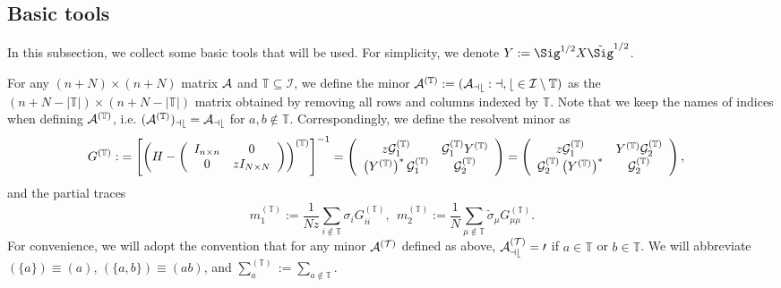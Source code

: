 \subsection{Basic tools}
In this subsection, we collect some basic tools that will be used. For simplicity, we denote $Y:=\Sig^{1/2} X \tilde \Sig^{1/2}$. 

\begin{definition}[Minors]
For any $ (n+N)\times (n+N)$ matrix $\cal A$ and $\mathbb T \subseteq \mathcal I$, we define the minor $\cal A^{(\mathbb T)}:=(\cal A_{ab}:a,b \in \mathcal I\setminus \mathbb T)$ as the $ (n+N-|\mathbb T|)\times (n+N-|\mathbb T|)$ matrix obtained by removing all rows and columns indexed by $\mathbb T$. Note that we keep the names of indices when defining $\cal A^{(\mathbb T)}$, i.e. $(\cal A^{(\mathbb{T})})_{ab}= \cal A_{ab}$ for $a,b \notin \mathbb{{T}}$. Correspondingly, we define the resolvent minor as
\begin{align*}
G^{(\mathbb T)}:&=\left[\left(H - \left( {\begin{array}{*{20}c}
   { I_{n\times n}} & 0  \\
   0 & { zI_{N\times N}}  \\
\end{array}} \right)\right)^{(\mathbb T)}\right]^{-1} = \left( {\begin{array}{*{20}c}
   { z\mathcal G_1^{(\mathbb T)}} & \mathcal G_1^{(\mathbb T)} Y^{(\mathbb T)}  \\
   {\left(Y^{(\mathbb T)}\right)^*\mathcal G_1^{(\mathbb T)}} & { \mathcal G_2^{(\mathbb T)} }  \\
\end{array}} \right)  = \left( {\begin{array}{*{20}c}
   { z\mathcal G_1^{(\mathbb T)}} & Y^{(\mathbb T)}\mathcal G_2^{(\mathbb T)}   \\
   {\mathcal G_2^{(\mathbb T)}}\left(Y^{(\mathbb T)}\right)^* & { \mathcal G_2^{(\mathbb T)} }  \\
\end{array}} \right),
\end{align*}
and the partial traces
$$m_1^{(\mathbb T)}:=\frac{1}{Nz}\sum_{i\notin \mathbb T}\sigma_i G_{ii}^{(\mathbb T)},\ \ m_2^{(\mathbb T)}:= \frac{1}{N}\sum_{\mu \notin \mathbb T}\tilde \sigma_\mu G_{\mu\mu}^{(\mathbb T)}.$$ 
For convenience, we will adopt the convention that for any minor $\cal A^{(T)}$ defined as above, $\cal A^{(T)}_{ab} = 0$ if $a \in \mathbb T$ or $b \in \mathbb T$. We will abbreviate $(\{a\})\equiv (a)$, $(\{a, b\})\equiv (ab)$, and $\sum_{a}^{(\mathbb T)} := \sum_{a\notin \mathbb T} .$
\end{definition}

